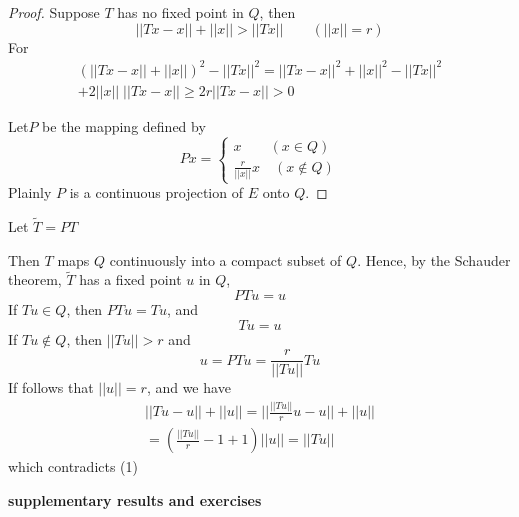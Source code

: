 \begin{proof}
  Suppose $T$ has no fixed point in $Q$, then
  \begin{equation*}
    || Tx - x || + || x || > || Tx || \qquad ( || x || = r) \tag{1}
  \end{equation*}
  For
  \begin{gather*}
    (|| Tx - x || + || x ||)^2 - || Tx ||^2 = || Tx - x ||^2 + || x ||^2
    - || Tx ||^2\\ 
    + 2 || x || \; || Tx - x || \ge 2r || Tx - x || > 0
  \end{gather*}
  
  Let\pageoriginale $P$ be the mapping defined by 
  $$
  Px = 
  \begin{cases}
    x  \qquad (x \in Q)\\
    \frac{r}{ || x ||} x \quad (x \notin Q)
  \end{cases}
  $$  
Plainly $P$ is a continuous projection of $E$ onto $Q$.
\end{proof}

Let $\tilde{T} = PT$

Then $T$ maps $Q$ continuously into a compact subset of $Q$. Hence, by
the Schauder theorem, $\tilde{T}$ has a fixed point $u$ in $Q$, 
$$
PTu = u
$$
If $Tu \in Q$, then $PTu = Tu$, and 
$$
Tu = u 
$$
If $Tu \not\in Q$, then $||Tu || > r$ and 
$$
u = PTu = \frac{r}{ || Tu ||} Tu
$$
If follows that $|| u || = r$, and we have
\begin{gather*}
  || Tu - u || + || u || = || \frac{|| Tu ||}{r} u - u || + || u ||\\
  = \left( \frac{|| Tu ||}{r} - 1 + 1 \right) || u || = || Tu ||
\end{gather*}
which contradicts (1)

\medskip
\begin{center}
\textbf{supplementary results and exercises}
\end{center}

